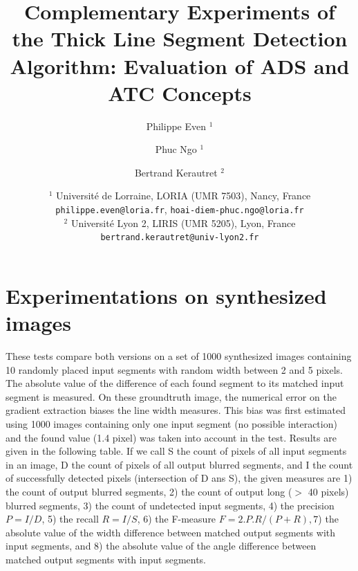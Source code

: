 \documentclass[11pt]{article}
\title{Complementary Experiments of the Thick Line Segment Detection Algorithm: Evaluation of ADS and ATC Concepts}
\date{
  $^1$ Universit\'e de Lorraine, LORIA (UMR 7503), Nancy, France \\
  \texttt{philippe.even@loria.fr},
  \texttt{hoai-diem-phuc.ngo@loria.fr}\\
  $^2$  Universit\'e Lyon 2, LIRIS (UMR 5205), Lyon, France\\
  \texttt{bertrand.kerautret@univ-lyon2.fr}}
\author{Philippe Even $^1$ \and Phuc Ngo $^1$ \and Bertrand Kerautret $^2$}
\begin{document}
\maketitle







\section{Experimentations on synthesized images}
These tests compare both versions on a set of 1000 synthesized images containing
10 randomly placed input segments with random width between 2 and 5 pixels.
The absolute value of the difference of each found segment to its matched input segment is measured.
On these groundtruth image, the numerical error on the gradient extraction biases the line width measures.
This bias was first estimated using 1000 images containing only one input segment (no possible interaction) and the found value (1.4 pixel) was taken into account in the test.
Results are given in the following table.
If we call S the count of pixels of all input segments in an image, D the count of pixels of all output blurred segments, and I the count of successfully detected pixels (intersection of D ans S), the given measures are 1) the count of output blurred segments, 2) the count of output long ($>$ 40 pixels) blurred segments, 3) the count of undetected input segments, 4) the precision $P = I/D$, 5) the recall $R = I/S$, 6) the F-measure $F = 2.P.R / (P+R), 7$) the absolute value of the width difference between matched output segments with input segments, and 8) the absolute value of the angle difference between matched output segments with input segments.

\pagebreak
\end{document}
